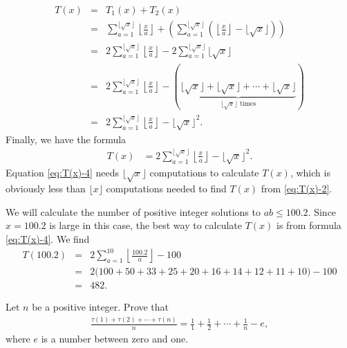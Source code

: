 \documentclass[12pt]{subfile}
\begin{document}
	\begin{eqnarray*}
		T(x) &=&  T_1(x) + T_2(x)\\
			 &=& \sum_{a=1}^{\lfloor\sqrt x\rfloor} \left\lfloor\frac{x}{a}\right\rfloor + \left(\sum_{a=1}^{\lfloor\sqrt x\rfloor} \left(\left\lfloor\frac{x}{a}\right\rfloor - \lfloor \sqrt x \rfloor\right)\right)\\
			 &=& 2\sum_{a=1}^{\lfloor\sqrt x\rfloor} \left\lfloor\frac{x}{a}\right\rfloor - 2\sum_{a=1}^{\lfloor\sqrt x\rfloor} \lfloor\sqrt x\rfloor\\
		     &=& 2\sum_{a=1}^{\lfloor\sqrt x\rfloor} \left\lfloor\frac{x}{a}\right\rfloor - \left(\underbrace{\lfloor \sqrt x \rfloor + \lfloor \sqrt x \rfloor + \cdots +‌\lfloor \sqrt x \rfloor}_{\lfloor \sqrt x \rfloor \text{ times}}\right)\\
		     &=& 2\sum_{a=1}^{\lfloor\sqrt x\rfloor} \left\lfloor\frac{x}{a}\right\rfloor - \lfloor \sqrt x \rfloor^2.
	\end{eqnarray*}
Finally, we have the formula
	\begin{align}
		T(x) &= 2\sum_{a=1}^{\lfloor\sqrt x\rfloor} \left\lfloor\frac{x}{a}\right\rfloor - \lfloor \sqrt x \rfloor^2.\label{eq:T(x)-4}
	\end{align}
Equation \eqref{eq:T(x)-4} needs $\lfloor \sqrt x \rfloor$ computations to calculate $T(x)$, which is obviously less than $\lfloor x \rfloor$ computations needed to find $T(x)$ from \eqref{eq:T(x)-2}.

	\begin{example}
		We will calculate the number of positive integer solutions to $ab \leq 100.2$. Since $x=100.2$ is large in this case, the best way to calculate $T(x)$ is from formula \eqref{eq:T(x)-4}. We find
			\begin{eqnarray*}
				T(100.2) &=& 2\sum_{a=1}^{10} \left\lfloor\frac{100.2}{a}\right\rfloor - 100\\
						 &=& 2\big(100 + 50 + 33 + 25 + 20 + 16 + 14 + 12 + 11 + 10\big) - 100\\
						 &=& 482.
			\end{eqnarray*}
	\end{example}

	\begin{theorem}
		Let $n$ be a positive integer. Prove that
			\begin{align*}
				\frac{\tau(1) + \tau(2) + \cdots + \tau(n)}{n} = \frac{1}{1} + \frac{1}{2} + \cdots + \frac{1}{n} - e,
			\end{align*}
		where $e$ is a number between zero and one.
	\end{theorem}
\end{document}
